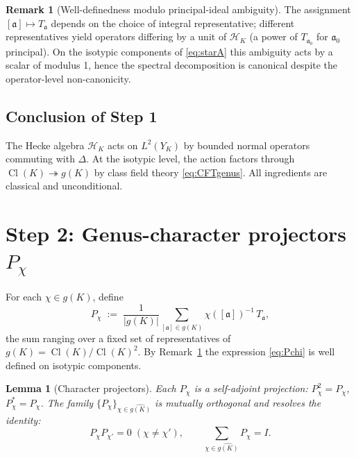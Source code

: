 \documentclass[11pt,a4paper,reqno]{amsart}
\newtheorem{lemma}[theorem]{Lemma}
\theoremstyle{definition}
\newtheorem{remark}[theorem]{Remark}
\DeclareMathOperator{\Cl}{Cl}
\newcommand{\fa}{\mathfrak{a}}
\newcommand{\YK}{Y_K}
\newcommand{\gK}{g(K)}
\newcommand{\dualgK}{\widehat{g(K)}}
\newcommand{\Heis}{\mathcal{H}}
\begin{document}
\begin{remark}[Well-definedness modulo principal-ideal ambiguity]\label{rem:welldef}
The assignment $[\fa]\mapsto T_\fa$ depends on the choice of integral representative; different representatives yield operators differing by a unit of $\Heis_K$ (a power of $T_{\fa_0}$ for $\fa_0$ principal). On the isotypic components of \eqref{eq:starA} this ambiguity acts by a scalar of modulus 1, hence the spectral decomposition is canonical despite the operator-level non-canonicity.
\end{remark}

\subsection*{Conclusion of Step 1}
The Hecke algebra $\Heis_K$ acts on $L^2(\YK)$ by bounded normal operators commuting with $\Delta$. At the isotypic level, the action factors through $\Cl(K)\twoheadrightarrow\gK$ by class field theory \eqref{eq:CFTgenus}. All ingredients are classical and unconditional.

\section{Step 2: Genus-character projectors $P_\chi$}\label{sec:step2}

For each $\chi\in\dualgK$, define
\begin{equation}\label{eq:Pchi}
  P_\chi \;:=\; \frac{1}{|\gK|}\sum_{[\fa]\in\gK} \chi([\fa])^{-1}\, T_\fa,
\end{equation}
the sum ranging over a fixed set of representatives of $\gK = \Cl(K)/\Cl(K)^2$. By Remark~\ref{rem:welldef} the expression \eqref{eq:Pchi} is well defined on isotypic components.

\begin{lemma}[Character projectors]\label{lem:Pchi}
Each $P_\chi$ is a self-adjoint projection: $P_\chi^2 = P_\chi$, $P_\chi^* = P_\chi$. The family $\{P_\chi\}_{\chi\in\dualgK}$ is mutually orthogonal and resolves the identity:
\[
  P_\chi P_{\chi'} = 0 \;(\chi\neq\chi'), \qquad
  \sum_{\chi\in\dualgK} P_\chi = I.
\]
\end{lemma}
\end{document}
